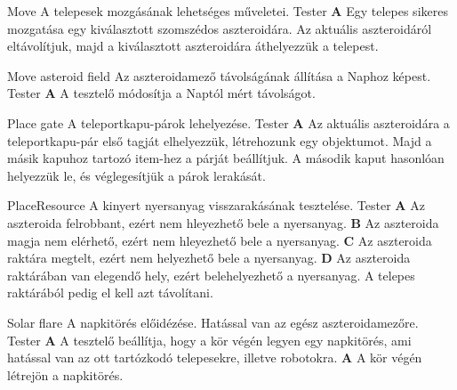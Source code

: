 \documentclass[../../projlab]{subfiles}
\begin{document}
\begin{use-case}
    {Move}
    {A telepesek mozgásának lehetséges műveletei. }
    {Tester} 
    \textbf{A}  Egy telepes sikeres mozgatása egy kiválasztott szomszédos aszteroidára. Az aktuális aszteroidáról eltávolítjuk, majd a kiválasztott aszteroidára áthelyezzük a telepest.\newline
\end{use-case}

\begin{use-case}
    {Move asteroid field}
    {Az aszteroidamező távolságának állítása a Naphoz képest.}
    {Tester} 
    \textbf{A} A tesztelő módosítja a Naptól mért távolságot. \newline
\end{use-case}

\begin{use-case}
    {Place gate}
    {A teleportkapu-párok lehelyezése. }
    {Tester} 
    \textbf{A}  Az aktuális aszteroidára a teleportkapu-pár első tagját elhelyezzük, létrehozunk egy objektumot. Majd a másik kapuhoz tartozó item-hez a párját beállítjuk. A második kaput hasonlóan helyezzük le, és véglegesítjük a párok lerakását. \newline
\end{use-case}

\begin{use-case}
    {PlaceResource}
    {A kinyert nyersanyag visszarakásának tesztelése.}
    {Tester} 
    \textbf{A} Az aszteroida felrobbant, ezért nem hleyezhető bele a nyersanyag.  \newline
    \textbf{B} Az aszteroida magja nem elérhető, ezért nem hleyezhető bele a nyersanyag.  \newline
    \textbf{C} Az aszteroida raktára megtelt, ezért nem helyezhető bele a nyersanyag.  \newline
    \textbf{D} Az aszteroida raktárában van elegendő hely, ezért belehelyezhető a nyersanyag. A telepes raktárából pedig el kell azt távolítani.  \newline

\end{use-case}

\begin{use-case}
    {Solar flare}
    {A napkitörés előidézése. Hatással van az egész aszteroidamezőre.}
    {Tester} 
    \textbf{A} A tesztelő beállítja, hogy a kör végén legyen egy napkitörés, ami hatással van az ott tartózkodó telepesekre, illetve robotokra. \newline
    \textbf{A} A kör végén létrejön a napkitörés. \newline
\end{use-case}
\end{document}
